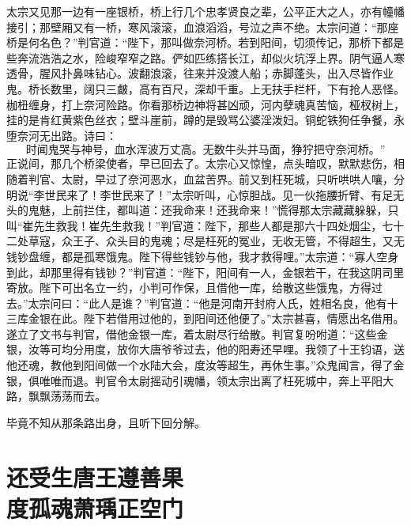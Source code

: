 \documentclass[12pt]{lsbook}
\begin{document}
太宗又见那一边有一座银桥，桥上行几个忠孝贤良之辈，公平正大之人，亦有幢幡接引；那壁厢又有一桥，寒风滚滚，血浪滔滔，号泣之声不绝。太宗问道：“那座桥是何名色？”判官道：“陛下，那叫做奈河桥。若到阳间，切须传记，那桥下都是些奔流浩浩之水，险峻窄窄之路。俨如匹练搭长江，却似火坑浮上界。阴气逼人寒透骨，腥风扑鼻味钻心。波翻浪滚，往来并没渡人船；赤脚蓬头，出入尽皆作业鬼。桥长数里，阔只三皻，高有百尺，深却千重。上无扶手栏杆，下有抢人恶怪。枷杻缠身，打上奈河险路。你看那桥边神将甚凶顽，河内孽魂真苦恼，桠杈树上，挂的是肯红黄紫色丝衣；壁斗崖前，蹲的是毁骂公婆淫泼妇。铜蛇铁狗任争餐，永堕奈河无出路。诗曰：
\[时闻鬼哭与神号，血水浑波万丈高。

无数牛头并马面，狰狞把守奈河桥。”
\]
正说间，那几个桥梁使者，早已回去了。太宗心又惊惶，点头暗叹，默默悲伤，相随着判官、太尉，早过了奈河恶水，血盆苦界。前又到枉死城，只听哄哄人嚷，分明说“李世民来了！李世民来了！”太宗听叫，心惊胆战。见一伙拖腰折臂、有足无头的鬼魅，上前拦住，都叫道：还我命来！还我命来！”慌得那太宗藏藏躲躲，只叫“崔先生救我！崔先生救我！”判官道：陛下，那些人都是那六十四处烟尘，七十二处草寇，众王子、众头目的鬼魂；尽是枉死的冤业，无收无管，不得超生，又无钱钞盘缠，都是孤寒饿鬼。陛下得些钱钞与他，我才救得哩。”太宗道：“寡人空身到此，却那里得有钱钞？”判官道：“陛下，阳间有一人，金银若干，在我这阴司里寄放。陛下可出名立一约，小判可作保，且借他一库，给散这些饿鬼，方得过去。”太宗问曰：“此人是谁？”判官道：“他是河南开封府人氏，姓相名良，他有十三库金银在此。陛下若借用过他的，到阳间还他便了。”太宗甚喜，情愿出名借用。遂立了文书与判官，借他金银一库，着太尉尽行给散。判官复吩咐道：“这些金银，汝等可均分用度，放你大唐爷爷过去，他的阳寿还早哩。我领了十王钧语，送他还魂，教他到阳间做一个水陆大会，度汝等超生，再休生事。”众鬼闻言，得了金银，俱唯唯而退。判官令太尉摇动引魂幡，领太宗出离了枉死城中，奔上平阳大路，飘飘荡荡而去。

毕竟不知从那条路出身，且听下回分解。

\chapter[还受生唐王遵善果\ 度孤魂萧瑀正空门]{还受生唐王遵善果\\ 度孤魂萧瑀正空门}\label{ch011}
\end{document}
